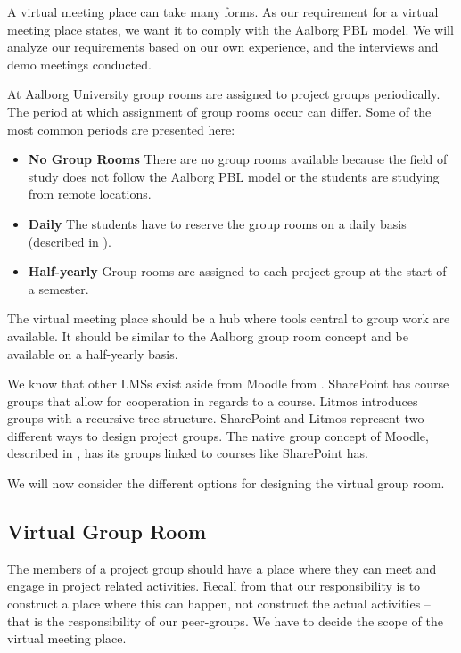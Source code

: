 A virtual meeting place can take many forms.
As our requirement for a virtual meeting place states, we want it to comply with the Aalborg PBL model.
We will analyze our requirements based on our own experience, and the interviews and demo meetings conducted.

At Aalborg University group rooms are assigned to project groups periodically.
The period at which assignment of group rooms occur can differ.
Some of the most common periods are presented here:
\begin{itemize}
	\item \textbf{No Group Rooms} There are no group rooms available because the field of study does not follow the Aalborg PBL model or the students are studying from remote locations.
	\item \textbf{Daily} The students have to reserve the group rooms on a daily basis (described in ).
	\item \textbf{Half-yearly} Group rooms are assigned to each project group at the start of a semester.
\end{itemize} 

The virtual meeting place should be a hub where tools central to group work are available.
It should be similar to the Aalborg group room concept and be available on a half-yearly basis.  

We know that other LMSs exist aside from Moodle from . 
SharePoint has course groups that allow for cooperation in regards to a course. 
Litmos introduces groups with a recursive tree structure. 
SharePoint and Litmos represent two different ways to design project groups. 
The native group concept of Moodle, described in , has its groups linked to courses like SharePoint has.   
\\




We will now consider the different options for designing the virtual group room.

\subsection{Virtual Group Room}
The members of a project group should have a place where they can meet and engage in project related activities.
Recall from  that our responsibility is to construct a place where this can happen, not construct the actual activities -- that is the responsibility of our peer-groups.
We have to decide the scope of the virtual meeting place.

